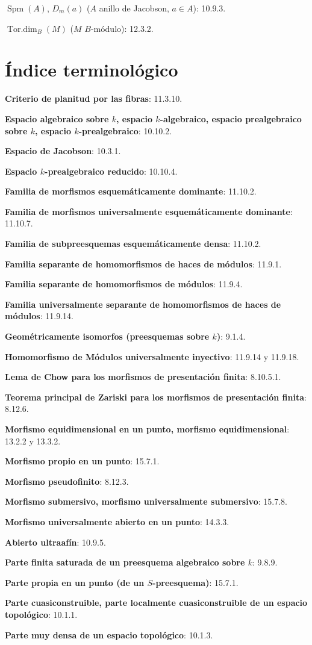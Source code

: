 $\operatorname{Spm}(A)$, $D_m(a)$ ($A$ anillo de Jacobson, $a\in A$): 10.9.3.

$\operatorname{Tor.dim}_{B}(M)$ ($M$ $B$-módulo): 12.3.2.
\endgroup

\clearpage
{}
{}
\section*{Índice terminológico}

\begingroup
\small
\setlength{\parindent}{0pt}
\setlength{\parskip}{2pt}
\newcommand{\EGAIVthreeTerm}[2]{\textbf{#1}: #2.\par}

\EGAIVthreeTerm{Criterio de planitud por las fibras}{11.3.10}
\EGAIVthreeTerm{Espacio algebraico sobre $k$, espacio $k$-algebraico,
espacio prealgebraico sobre $k$, espacio $k$-prealgebraico}{10.10.2}
\EGAIVthreeTerm{Espacio de Jacobson}{10.3.1}
\EGAIVthreeTerm{Espacio $k$-prealgebraico reducido}{10.10.4}
\EGAIVthreeTerm{Familia de morfismos esquemáticamente dominante}{11.10.2}
\EGAIVthreeTerm{Familia de morfismos universalmente esquemáticamente dominante}{11.10.7}
\EGAIVthreeTerm{Familia de subpreesquemas esquemáticamente densa}{11.10.2}
\EGAIVthreeTerm{Familia separante de homomorfismos de haces de módulos}{11.9.1}
\EGAIVthreeTerm{Familia separante de homomorfismos de módulos}{11.9.4}
\EGAIVthreeTerm{Familia universalmente separante de homomorfismos de haces de módulos}{11.9.14}
\EGAIVthreeTerm{Geométricamente isomorfos (preesquemas sobre $k$)}{9.1.4}
\EGAIVthreeTerm{Homomorfismo de Módulos universalmente inyectivo}{11.9.14 y 11.9.18}
\EGAIVthreeTerm{Lema de Chow para los morfismos de presentación finita}{8.10.5.1}
\EGAIVthreeTerm{Teorema principal de Zariski para los morfismos de presentación finita}{8.12.6}
\EGAIVthreeTerm{Morfismo equidimensional en un punto, morfismo equidimensional}{13.2.2 y 13.3.2}
\EGAIVthreeTerm{Morfismo propio en un punto}{15.7.1}
\EGAIVthreeTerm{Morfismo pseudofinito}{8.12.3}
\EGAIVthreeTerm{Morfismo submersivo, morfismo universalmente submersivo}{15.7.8}
\EGAIVthreeTerm{Morfismo universalmente abierto en un punto}{14.3.3}
\EGAIVthreeTerm{Abierto ultraafín}{10.9.5}
\EGAIVthreeTerm{Parte finita saturada de un preesquema algebraico sobre $k$}{9.8.9}
\EGAIVthreeTerm{Parte propia en un punto (de un $S$-preesquema)}{15.7.1}
\EGAIVthreeTerm{Parte cuasiconstruible, parte localmente cuasiconstruible de un espacio topológico}{10.1.1}
\EGAIVthreeTerm{Parte muy densa de un espacio topológico}{10.1.3}

